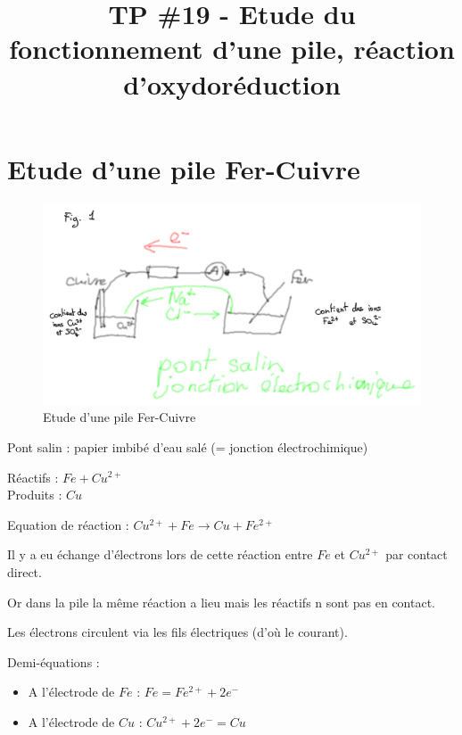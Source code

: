 \documentclass[12pt]{article}
\title{\textbf{TP \#19 - Etude du fonctionnement d'une pile, réaction d'oxydoréduction}}
\date{}
\begin{document}
\maketitle

\section{}
\section{Etude d'une pile Fer-Cuivre}

\begin{figure}[htp]
\centering
\includegraphics[scale=0.9]{img/tp19_fig1.png}
\caption{Etude d'une pile Fer-Cuivre}
\label{}
\end{figure}

Pont salin : papier imbibé d'eau salé (= jonction électrochimique)

Réactifs : $Fe + Cu^{2+}$ \\
Produits : $Cu$

Equation de réaction : $Cu^{2+} + Fe \rightarrow Cu + Fe^{2+}$

Il y a eu échange d'électrons lors de cette réaction entre $Fe$ et $Cu^{2+}$ par contact direct.

Or dans la pile la même réaction a lieu mais les réactifs n sont pas en contact.

Les électrons circulent via les fils électriques (d'où le courant).

Demi-équations :
\begin{itemize}
\item A l'électrode de $Fe$ : $Fe = Fe^{2+} + 2e^-$
\item A l'électrode de $Cu$ : $Cu^{2+} + 2e^- = Cu$
\end{itemize}
\end{document}

